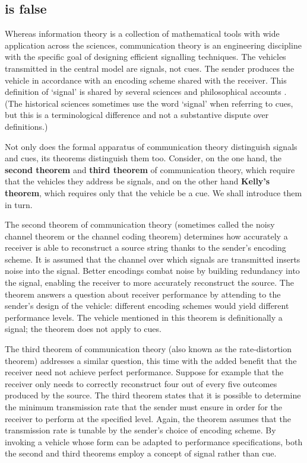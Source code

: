 \documentclass[12pt]{article}
\begin{document}
\subsection{\act{} is false}\label{subsec:actFalse}

Whereas information theory is a collection of mathematical tools with wide application across the sciences, communication theory is an engineering discipline with the specific goal of designing efficient signalling techniques.
The vehicles transmitted in the central model are signals, not cues.
The sender produces the vehicle in accordance with an encoding scheme shared with the receiver.
This definition of `signal' is shared by several sciences \citep{shannon1948mathematicalc,maynardsmith2003animal} and philosophical accounts \citep[$\S$6]{millikan2004varieties} \citep{bergstrom2011transmission}.
(The historical sciences sometimes use the word `signal' when referring to cues, but this is a terminological difference and not a substantive dispute over definitions.)

Not only does the formal apparatus of communication theory distinguish signals and cues, its theorems distinguish them too.
Consider, on the one hand, the \textbf{second theorem} and \textbf{third theorem} of communication theory, which require that the vehicles they address be signals, and on the other hand \textbf{Kelly's theorem}, which requires only that the vehicle be a cue.
We shall introduce them in turn.

The second theorem of communication theory (sometimes called the noisy channel theorem or the channel coding theorem) determines how accurately a receiver is able to reconstruct a source string thanks to the sender's encoding scheme.
It is assumed that the channel over which signals are transmitted inserts noise into the signal.
Better encodings combat noise by building redundancy into the signal, enabling the receiver to more accurately reconstruct the source.
The theorem answers a question about receiver performance by attending to the sender's design of the vehicle: different encoding schemes would yield different performance levels.
The vehicle mentioned in this theorem is definitionally a signal; the theorem does not apply to cues.

The third theorem of communication theory (also known as the rate-distortion theorem) addresses a similar question, this time with the added benefit that the receiver need not achieve perfect performance.
Suppose for example that the receiver only needs to correctly reconstruct four out of every five outcomes produced by the source.
The third theorem states that it is possible to determine the minimum transmission rate that the sender must ensure in order for the receiver to perform at the specified level.
Again, the theorem assumes that the transmission rate is tunable by the sender's choice of encoding scheme.
By invoking a vehicle whose form can be adapted to performance specifications, both the second and third theorems employ a concept of signal rather than cue.
\end{document}
